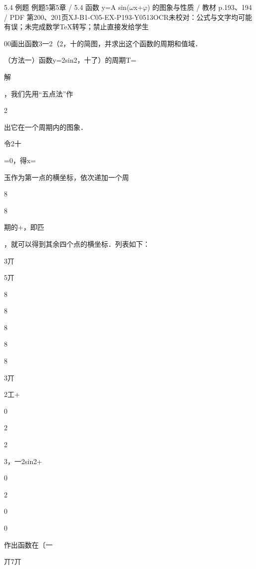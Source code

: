 \begin{bankitem}{5.4 例题 例题5}{第5章 / 5.4 函数 y=A sin(\ensuremath{\omega}x+\ensuremath{\varphi}) 的图象与性质 / 教材 p.193、194 / PDF 第200、201页}{XJ-B1-C05-EX-P193-Y0513}{OCR未校对：公式与文字均可能有误；未完成数学TeX转写；禁止直接发给学生}
\begin{ocrdraft}
\par
00画出函数3一2（2，十的简图，并求出这个函数的周期和值域．
\par
（方法一）函数y=2sin2，十了）的周期T=
\par
解
\par
，我们先用“五点法”作
\par
2
\par
出它在一个周期内的图象．
\par
令2十
\par
=0，得x=
\par
玉作为第一点的横坐标，依次递加一个周
\par
8
\par
8
\par
期的+，即匹
\par
，就可以得到其余四个点的横坐标．列表如下：
\par
3丌
\par
5丌
\par
8
\par
8
\par
8
\par
8
\par
8
\par
3丌
\par
2工+
\par
0
\par
2
\par
2
\par
3，一2sin2+
\par
0
\par
2
\par
0
\par
0
\par
作出函数在〔一
\par
丌7丌
\par

\end{ocrdraft}
\end{bankitem}
